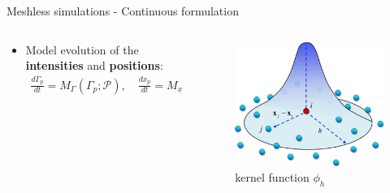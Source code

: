 \documentclass[aspectratio=169]{beamer} %
\begin{document}
\begin{frame}{Meshless simulations - Continuous formulation}
\begin{columns}[t]
\begin{column}{0.7\textwidth}
\begin{itemize}
                \item Model evolution of the \textbf{intensities} and \textbf{positions}:
                      \begin{eqnarray*}
                          \frac{d\Gamma_p}{dt} = M_\Gamma(\Gamma_p; \mathcal P), \quad \frac{d x_p}{d t} = M_x(x_p; \mathcal P)
                      \end{eqnarray*}
            \end{itemize}
        \end{column}
        \begin{column}{0.3\textwidth}
            \begin{figure}
                \includegraphics[width=\textwidth]{images/kernel.png}
                \caption*{ kernel function $\phi_h$}
            \end{figure}
        \end{column}
    \end{columns}
\end{frame}
\end{document}
